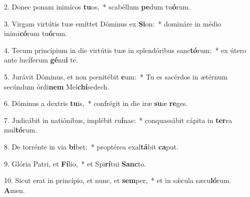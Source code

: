 2. Donec ponam inimícos \textbf{tu}os,~*  scabéllum \textbf{pe}dum tu\textbf{ó}rum.\

3. Virgam virtútis tuæ emíttet Dóminus ex \textbf{Si}on:~*  domináre in médio inimi\textbf{có}rum tu\textbf{ó}rum.\

4. Tecum princípium in die virtútis tuæ in splendóribus sanc\textbf{tó}rum:~*  ex útero ante lucíferum \textbf{gé}nu\textbf{i} te.\

5. Jurávit Dóminus, et non pœnitébit \textbf{e}um:~*  Tu es sacérdos in ætérnum secúndum órdi\textbf{nem} Mel\textbf{chí}sedech.\

6. Dóminus a dextris \textbf{tu}is,~*  confrégit in die iræ \textbf{su}æ \textbf{re}ges.\

7. Judicábit in natiónibus, implébit ru\textbf{í}nas:~*  conquassábit cápita in \textbf{ter}ra mul\textbf{tó}rum.\

8. De torrénte in via \textbf{bi}bet:~*  proptérea exal\textbf{tá}bit \textbf{ca}put.\

9. Glória Patri, et \textbf{Fí}lio,~*  et Spi\textbf{rí}tui \textbf{Sanc}to.\

10. Sicut erat in princípio, et nunc, et \textbf{sem}per,~*  et in sǽcula sæcu\textbf{ló}rum. \textbf{A}men.\

